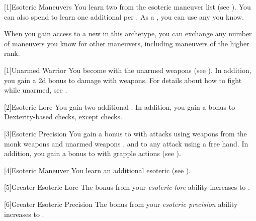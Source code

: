         [1]{Esoteric Maneuvers} 
        You learn two  from the esoteric maneuver list (see ).
        You can also spend  to learn one additional  per .
        As a , you can use any  you know.

        When you gain access to a new  in this archetype,
            you can exchange any number of maneuvers you know for other maneuvers,
            including maneuvers of the higher rank.

        [1]{Unarmed Warrior} You become  with the unarmed weapons  (see ).
        In addition, you gain a \plus2d bonus to damage with  weapons.
        For details about how to fight while unarmed, see .

        [2]{Esoteric Lore} You gain two additional .
        In addition, you gain a  bonus to Dexterity-based checks, except  checks.

        [3]{Esoteric Precision} You gain a  bonus to  with attacks using weapons from the monk weapons and unarmed weapons , and to any attack using a free hand.
        In addition, you gain a  bonus to  with grapple actions (see ).




        [4]{Esoteric Maneuver} You learn an additional esoteric  (see ).

        [5]{Greater Esoteric Lore} The bonus from your \textit{esoteric lore} ability increases to .

        [6]{Greater Esoteric Precision} The bonus from your \textit{esoteric precision} ability increases to .

